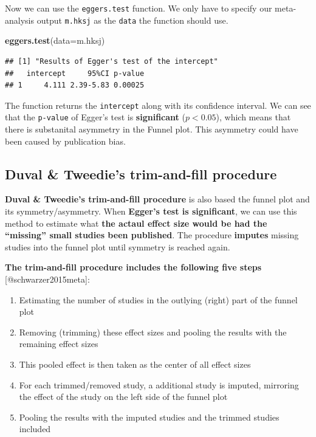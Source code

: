 \documentclass[]{book}
\newenvironment{Shaded}{\begin{snugshade}}{\end{snugshade}}
\newcommand{\DataTypeTok}[1]{\textcolor[rgb]{0.13,0.29,0.53}{#1}}
\newcommand{\KeywordTok}[1]{\textcolor[rgb]{0.13,0.29,0.53}{\textbf{#1}}}
\newcommand{\NormalTok}[1]{#1}
\providecommand{\tightlist}{%
  \setlength{\itemsep}{0pt}\setlength{\parskip}{0pt}}
\begin{document}
Now we can use the \texttt{eggers.test} function. We only have to specify our meta-analysis output \texttt{m.hksj} as the \texttt{data} the function should use.

\begin{Shaded}
\begin{Highlighting}[]
\KeywordTok{eggers.test}\NormalTok{(}\DataTypeTok{data=}\NormalTok{m.hksj)}
\end{Highlighting}
\end{Shaded}

\begin{verbatim}
## [1] "Results of Egger's test of the intercept"
##   intercept     95%CI p-value
## 1     4.111 2.39-5.83 0.00025
\end{verbatim}

The function returns the \texttt{intercept} along with its confidence interval. We can see that the \texttt{p-value} of Egger's test is \textbf{significant} (\(p<0.05\)), which means that there is substanital asymmetry in the Funnel plot. This asymmetry could have been caused by publication bias.

\hypertarget{dant}{%
\subsection{Duval \& Tweedie's trim-and-fill procedure}\label{dant}}

\textbf{Duval \& Tweedie's trim-and-fill procedure} \citep{duval2000trim} is also based the funnel plot and its symmetry/asymmetry. When \textbf{Egger's test is significant}, we can use this method to estimate what \textbf{the actaul effect size would be had the ``missing'' small studies been published}. The procedure \textbf{imputes} missing studies into the funnel plot until symmetry is reached again.

\begin{rmdinfo}
\textbf{The trim-and-fill procedure includes the following five steps}
{[}@schwarzer2015meta{]}:

\begin{enumerate}
.{enumi{enumi}.}
\tightlist
\item
  Estimating the number of studies in the outlying (right) part of the
  funnel plot
\item
  Removing (trimming) these effect sizes and pooling the results with
  the remaining effect sizes
\item
  This pooled effect is then taken as the center of all effect sizes
\item
  For each trimmed/removed study, a additional study is imputed,
  mirroring the effect of the study on the left side of the funnel plot
\item
  Pooling the results with the imputed studies and the trimmed studies
  included
\end{enumerate}
\end{rmdinfo}
\end{document}
